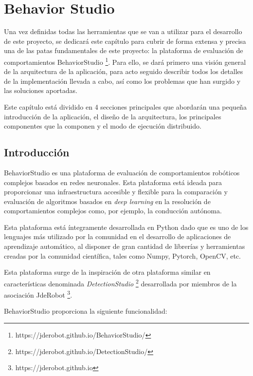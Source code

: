 \chapter{Behavior Studio}

Una vez definidas todas las herramientas que se van a utilizar para el desarrollo de este proyecto, se dedicará este capítulo para cubrir de forma extensa y precisa una de las patas fundamentales de este proyecto: la plataforma de evaluación de comportamientos BehaviorStudio \footnote{https://jderobot.github.io/BehaviorStudio/}. Para ello, se dará primero una visión general de la arquitectura de la aplicación, para acto seguido describir todos los detalles de la implementación llevada a cabo, así como los problemas que han surgido y las soluciones aportadas.

Este capítulo está dividido en 4 secciones principales que abordarán una pequeña introducción de la aplicación, el diseño de la arquitectura, los principales componentes que la componen y el modo de ejecución distribuido.

\section{Introducción}

BehaviorStudio es una plataforma de evaluación de comportamientos robóticos complejos basados en redes neuronales. Esta plataforma está ideada para proporcionar una infraestructura accesible y flexible para la comparación y evaluación de algoritmos basados en \textit{deep learning} en la resolución de comportamientos complejos como, por ejemplo, la conducción autónoma.

Esta plataforma está íntegramente desarrollada en Python dado que es uno de los lenguajes más utilizado por la comunidad en el desarrollo de aplicaciones de aprendizaje automático, al disponer de gran cantidad de librerías y herramientas creadas por la comunidad científica, tales como Numpy, Pytorch, OpenCV, etc.

Esta plataforma surge de la inspiración de otra plataforma similar en características denominada \textit{DetectionStudio} \footnote{https://jderobot.github.io/DetectionStudio/} desarrollada por miembros de la asociación JdeRobot \footnote{https://jderobot.github.io}.

\noindent BehaviorStudio proporciona la siguiente funcionalidad:


